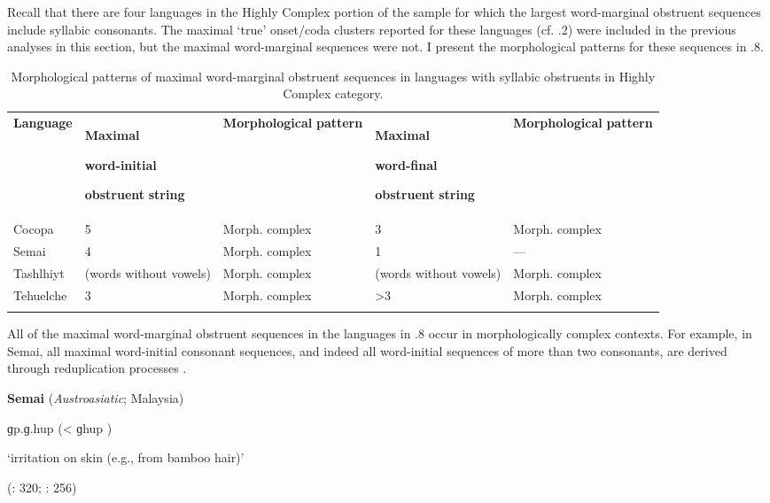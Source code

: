   Recall that there are four languages in the Highly Complex portion of the sample for which the largest word-marginal obstruent sequences include syllabic consonants. The maximal ‘true’ onset/coda clusters reported for these languages (cf. .2) were included in the previous analyses in this section, but the maximal word-marginal sequences were not. I present the morphological patterns for these sequences in .8.

\begin{table}
\begin{tabularx}{\textwidth}{XXXXX}
\lsptoprule

\textbf{Language} & { \textbf{Maximal} }

{ \textbf{word-initial} }

 \textbf{obstruent} \textbf{string} & \textbf{Morphological} \textbf{pattern} & { \textbf{Maximal} }

{ \textbf{word-final} }

 \textbf{obstruent} \textbf{string} & \textbf{Morphological} \textbf{pattern}\\
Cocopa & 5 & Morph. complex & 3 & Morph. complex\\
Semai & 4 & Morph. complex & 1 & —\\
Tashlhiyt & (words without vowels) & Morph. complex & (words without vowels) & Morph. complex\\
Tehuelche & 3 & Morph. complex & >3 & Morph. complex\\
\lspbottomrule
\end{tabularx}
\caption{\label{3.8}Morphological patterns of maximal word-marginal obstruent sequences in languages with syllabic obstruents in Highly Complex category.}
\end{table}

  All of the maximal word-marginal obstruent sequences in the languages in .8 occur in morphologically complex contexts. For example, in Semai, all maximal word-initial consonant sequences, and indeed all word-initial sequences of more than two consonants, are derived through reduplication processes .

\ea\label{ex:(3.23)}
  \textbf{Semai} (\textit{Austroasiatic}; Malaysia)

ɡp.ɡ.hup (< ɡhup )

\glt ‘irritation on skin (e.g., from bamboo hair)’

(\citealt{Sloan1988}: 320; \citealt{Diffloth1976a}: 256)

